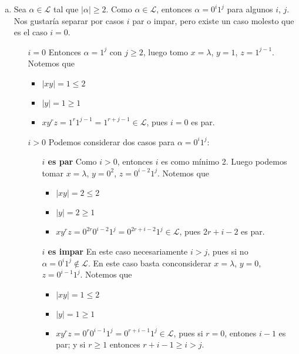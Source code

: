 \documentclass[hidelinks,a4paper,10pt, nofootinbib]{article}
\newcommand{\ele}{\mathcal{L}}
\begin{document}
\begin{enumerate}[a.]
\item Sea $\alpha \in \ele$ tal que $|\alpha| \geq 2$.
Como $\alpha \in \ele$, entonces $\alpha = 0^i1^j$ para algunos $i$, $j$.
Nos gustaría separar por casos $i$ par o impar, pero existe un caso molesto que es el caso $i = 0$.

\begin{enumerate}
\item[\underline{$i = 0$}] Entonces $\alpha = 1^j$ con $j \geq 2$,
                           luego tomo $x = \lambda$, $y = 1$, $z = 1^{j-1}$.
    Notemos que
    \begin{itemize}
    \item $|x y| =1 \leq 2$
    \item $|y| = 1 \geq 1$
    \item $xy^rz = 1^r1^{j-1} = 1^{r+j-1} \in \ele$, pues $i = 0$ es par.
    \end{itemize}
\item[\underline{$i > 0$}] Podemos considerar dos casos para $\alpha = 0^i1^j$:
  \begin{itemize}
  \item[\textbf{$i$ es par}] Como $i > 0$, entonces $i$ es como mínimo 2. Luego podemos tomar
               $x = \lambda$, $y = 0^2$, $z = 0^{i-2}1^j$. Notemos que
        \begin{itemize}
        \item $|x y| = 2 \leq 2$
        \item $|y| = 2 \geq 1$
        \item $xy^rz = 0^{2r}0^{i-2}1^j = 0^{2r+i-2}1^j \in \ele$, pues $2r+i-2$ es par.
        \end{itemize}
  \item[\textbf{$i$ es impar}] En este caso necesariamente $i > j$,
               pues si no $\alpha = 0^i1^j \not\in \ele$.
               En este caso basta conconsiderar $x = \lambda$, $y = 0$, $z = 0^{i-1}1^j$.
               Notemos que
        \begin{itemize}
        \item $|x y| = 1 \leq 2$
        \item $|y| = 1 \geq 1$
        \item $xy^rz = 0^{r}0^{i-1}1^j = 0^{r+i-1}1^j \in \ele$,
             pues si $r = 0$, entones $i - 1$ es par; y si $r \geq 1$ entonces $r + i - 1 \geq i > j$.
        \end{itemize}
    \end{itemize}
\end{enumerate}


\end{enumerate}
\end{document}

